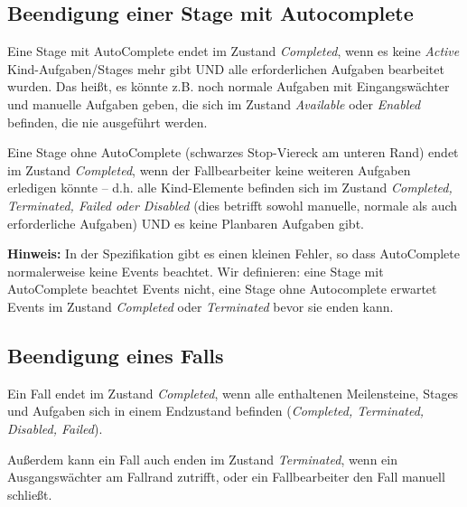 \documentclass[12pt,report]{snetTeaching}
\begin{document}


\subsection{Beendigung einer Stage mit Autocomplete}

Eine Stage mit AutoComplete endet im Zustand \emph{Completed}, wenn es keine \emph{Active} Kind-Aufgaben/Stages mehr gibt UND alle erforderlichen Aufgaben bearbeitet wurden. Das heißt, es könnte z.B. noch normale Aufgaben mit Eingangswächter und manuelle Aufgaben geben, die sich im Zustand \emph{Available} oder \emph{Enabled} befinden, die nie ausgeführt werden.

Eine Stage ohne AutoComplete (schwarzes Stop-Viereck am unteren Rand) endet im Zustand \emph{Completed}, wenn der Fallbearbeiter keine weiteren Aufgaben erledigen könnte -- d.h. alle Kind-Elemente befinden sich im Zustand \emph{Completed, Terminated, Failed oder Disabled} (dies betrifft sowohl manuelle, normale als auch erforderliche Aufgaben) UND es keine Planbaren Aufgaben gibt.

\textbf{Hinweis:} In der Spezifikation gibt es einen kleinen Fehler, so dass AutoComplete normalerweise keine Events beachtet. Wir definieren: eine Stage mit AutoComplete beachtet Events nicht, eine Stage ohne Autocomplete erwartet Events im Zustand \emph{Completed} oder \emph{Terminated} bevor sie enden kann.



\subsection{Beendigung eines Falls}

Ein Fall endet im Zustand \emph{Completed}, wenn alle enthaltenen Meilensteine, Stages und Aufgaben  sich in einem Endzustand befinden (\emph{Completed, Terminated, Disabled, Failed}). 

Außerdem kann ein Fall auch enden im Zustand \emph{Terminated},  wenn ein Ausgangswächter am Fallrand zutrifft, oder ein Fallbearbeiter den Fall manuell schließt. 
\end{document}
